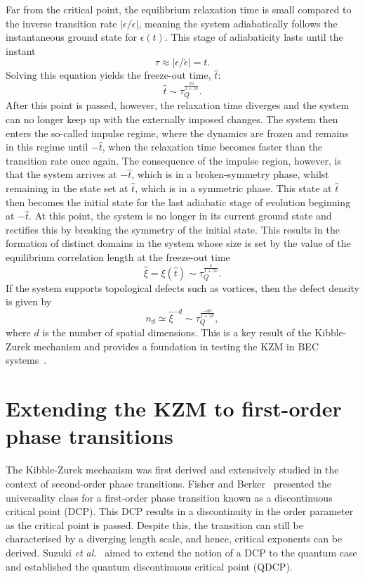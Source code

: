 Far from the critical point, the equilibrium relaxation time is small compared
to the inverse transition rate \( |\epsilon/\dot{\epsilon}| \), meaning the system
adiabatically follows the instantaneous ground state for \( \epsilon(t) \).
This stage of adiabaticity lasts until the instant
\begin{equation}
    \tau \approx |\epsilon/\dot{\epsilon}|=t.
    \label{eq: freeze-out-equal}
\end{equation}
Solving this equation yields the freeze-out time, \( \hat{t} \):
\begin{equation}
    \hat{t} \sim \tau_Q^\frac{z\nu}{1 + z\nu}.
    \label{eq: freeze-out-scaling}
\end{equation}
After this point is passed, however, the relaxation time diverges and the system
can no longer keep up with the externally imposed changes.
The system then enters the so-called impulse regime, where the dynamics are
frozen and remains in this regime until \( -\hat{t} \), when the relaxation
time becomes faster than the transition rate once again.
The consequence of the impulse region, however, is that the system arrives at
\( -\hat{t} \), which is in a broken-symmetry phase, whilst remaining
in the state set at \( \hat{t} \), which is in a symmetric phase.
This state at \( \hat{t} \) then becomes the initial state for the last adiabatic
stage of evolution beginning at \( -\hat{t} \).
At this point, the system is no longer in its current ground state and rectifies
this by breaking the symmetry of the initial state.
This results in the formation of distinct domains in the system whose size is
set by the value of the equilibrium correlation length at the freeze-out time
\begin{equation}
    \hat{\xi}=\xi(\hat{t}) \sim \tau_Q^{\frac{\nu}{1 + z\nu}}.
    \label{eq: KZM-domain-size}
\end{equation}
If the system supports topological defects such as vortices, then the defect
density is given by
\begin{equation}
    n_d \simeq \hat{\xi}^{-d} \sim \tau_Q^{\frac{-d\nu}{1+z\nu}},
\end{equation}
where \( d \) is the number of spatial dimensions.
This is a key result of the Kibble-Zurek mechanism and provides a
foundation in testing the KZM in BEC systems~\cite{Damski2007, Swislocki2013,
    Anquez2016, Saito2007A, Saito2007B}.

\section{Extending the KZM to first-order phase transitions}
The Kibble-Zurek mechanism was first derived and extensively studied in the
context of second-order phase transitions.
Fisher and Berker~\cite{Fisher1982} presented the universality class for
a first-order phase transition known as a discontinuous critical point (DCP).
This DCP results in a discontinuity in the order parameter as the critical point
is passed.
Despite this, the transition can still be characterised by a diverging length
scale, and hence, critical exponents can be derived.
Suzuki \textit{et al.}~\cite{Suzuki2015} aimed to extend the notion of a DCP to
the quantum case and established the quantum discontinuous critical point
(QDCP).

